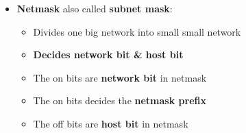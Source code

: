 \setlength{\columnsep}{3pt}
\begin{flushleft}

\begin{itemize}
	\item \textbf{Netmask} also called \textbf{subnet mask}:
	\begin{itemize}
		\item Divides one big network into small small network
		\item \textbf{Decides network bit \& host bit}
		\item The \color{blue} on bits \color{black} are \textbf{network bit} in netmask
		\item The \color{blue} on bits \color{black} decides the \textbf{netmask prefix}
		\item The \color{red} off bits \color{black} are \textbf{host bit} in netmask


\end{itemize}
\end{itemize}
\end{flushleft}
